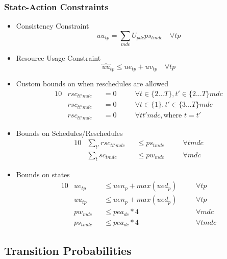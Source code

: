 \documentclass{article}
\begin{document}
\subsubsection{State-Action Constraints}
\label{state-action constraints}
\begin{itemize}
	
	\item Consistency Constraint
	\begin{equation}
		uu_{tp} = \sum_{mdc} U_{pdc} ps_{tmdc} \quad \forall tp
	\end{equation}
	\item Resource Usage Constraint
	\begin{equation}
		\hat{uu}_{tp} \le ue_{tp}+uv_{tp} \quad \forall tp
	\end{equation}
	
	\item Custom bounds on when reschedules are allowed
	\begin{alignat}{10}
		& rsc_{tt'mdc} && = 0 \quad && \forall t \in \{ 2...T \}, t' \in \{2...T\} mdc \\
		& rsc_{tt'mdc} && = 0 \quad && \forall t \in \{ 1 \}, t'\in \{ 3...T \} mdc  \\
		& rsc_{tt'mdc} && = 0 \quad && \forall tt'mdc, \text{where } t=t' 
	\end{alignat}  
	
	\item Bounds on Schedules/Reschedules
	\begin{alignat}{10}
		& \sum_{t'} rsc_{tt'mdc} 	&& \le ps_{tmdc} \quad  && \forall tmdc  \\
		& \sum_{t} sc_{tmdc} 		&& \le pw_{mdc} \quad 	&& \forall mdc 
	\end{alignat}  
	
	\item Bounds on states
	\begin{alignat}{10}
		& ue_{tp} 	&& \le uen_{p} + max(ued_p) \quad 	&& \forall tp \\
		& uu_{tp} 	&& \le uen_{p} + max(ued_p) \quad 	&& \forall tp \\
		& pw_{mdc} 	&& \le pea_{dc} * 4 \quad 			&& \forall mdc \\
		& ps_{tmdc} && \le pea_{dc} * 4 \quad 			&& \forall tmdc
	\end{alignat}
\end{itemize}

\subsection{Transition Probabilities}
\end{document}
